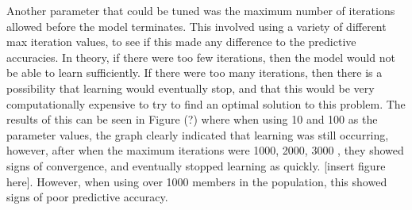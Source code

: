 \documentclass[11pt]{article}
\begin{document}
Another parameter that could be tuned was the maximum number of iterations allowed before the model terminates. This involved using a variety of different max iteration values, to see if this made any difference to the predictive accuracies. In theory, if there were too few iterations, then the model would not be able to learn sufficiently. If there were too many iterations, then there is a possibility that learning would eventually stop, and that this would be very computationally expensive to try to find an optimal solution to this problem. The results of this can be seen in Figure (?) where when using 10 and 100 as the parameter values, the graph clearly indicated that learning was still occurring, however, after when the maximum iterations were 1000, 2000, 3000 , they showed signs of convergence, and eventually stopped learning as quickly. [insert figure here]. However, when using over 1000 members in the population, this showed signs of poor predictive  accuracy.




\end{document}
